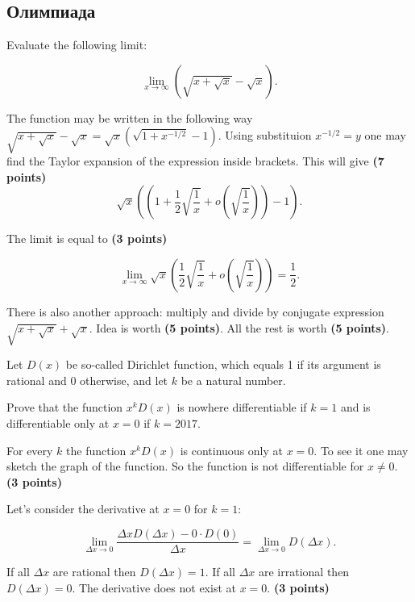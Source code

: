\documentclass[addpoints, answers]{exam} %
\begin{document}
\subsection{Олимпиада}


\begin{questions}

\question[10] Evaluate the following limit:

\[
\lim_{x \to \infty} \left( \sqrt{x+\sqrt{x}} - \sqrt{x} \right).
\]

\begin{solution}

The function may be written in the following way $\sqrt{x+\sqrt{x}} - \sqrt{x} = \sqrt{x} \left( \sqrt{1+x^{-1/2}} -1 \right)$. Using substituion $x^{-1/2} = y$ one may find the Taylor expansion of the expression inside brackets. This will give \textbf{(7 points)}
\[
\sqrt{x} \left( \left( 1+\frac{1}{2} \sqrt{\frac{1}{x}} + o \left(\sqrt{\frac{1}{x}}\right) \right) -1 \right).
\]

The limit is equal to \textbf{(3 points)}

\[
\lim_{x \to \infty} \sqrt{x} \left( \frac{1}{2} \sqrt{\frac{1}{x}} + o \left(\sqrt{\frac{1}{x}} \right) \right) = \frac{1}{2}.
\]

There is also another approach: multiply and divide by conjugate expression $\sqrt{x + \sqrt{x}} + \sqrt{x}$. Idea is worth \textbf{(5 points)}. All the rest is worth \textbf{(5 points)}.

\end{solution}

\question[10] Let $D(x)$ be so-called Dirichlet function, which equals 1 if its argument is rational and 0 otherwise, and let $k$ be a natural number.

Prove that the function $x^k D(x)$ is nowhere differentiable if $k=1$ and is differentiable only at $x=0$ if $k=2017$.

\begin{solution}

For every $k$ the function $x^k D(x)$ is continuous only at $x=0$. To see it one may sketch the graph of the function. So the function is not differentiable for $x\neq 0$. \textbf{(3 points)}

Let's consider the derivative at $x=0$ for $k=1$:

\[
\lim_{\Delta x \to 0} \frac{\Delta x D(\Delta x) - 0 \cdot D(0)}{\Delta x} = \lim_{\Delta x \to 0} D(\Delta x).
\]

If all $\Delta x$ are rational then $D(\Delta x)=1$.  If all $\Delta x$ are irrational then $D(\Delta x)=0$. The derivative does not exist at $x=0$. \textbf{(3 points)}


\end{solution}
\end{questions}
\end{document}
